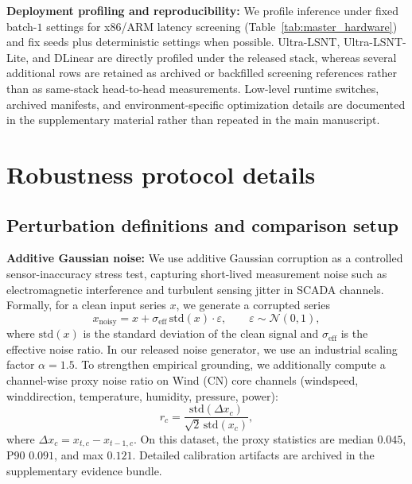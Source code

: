 ﻿\documentclass[review,1p,times]{elsarticle}
\begin{document}
\noindent\textbf{Deployment profiling and reproducibility:} We profile inference under fixed batch-$1$ settings for x86/ARM latency screening (Table~\ref{tab:master_hardware}) and fix seeds plus deterministic settings when possible. Ultra-LSNT, Ultra-LSNT-Lite, and DLinear are directly profiled under the released stack, whereas several additional rows are retained as archived or backfilled screening references rather than as same-stack head-to-head measurements. Low-level runtime switches, archived manifests, and environment-specific optimization details are documented in the supplementary material rather than repeated in the main manuscript.

\section{Robustness protocol details}\label{app:robust_details}
\subsection{Perturbation definitions and comparison setup}
\noindent\textbf{Additive Gaussian noise:}
We use additive Gaussian corruption as a controlled sensor-inaccuracy stress test, capturing short-lived measurement noise such as electromagnetic interference and turbulent sensing jitter in SCADA channels.
Formally, for a clean input series $x$, we generate a corrupted series
\begin{equation}
x_{\text{noisy}} = x + \sigma_{\mathrm{eff}}\,\mathrm{std}(x)\cdot \varepsilon, \qquad \varepsilon \sim \mathcal{N}(0,1),
\end{equation}
where $\mathrm{std}(x)$ is the standard deviation of the clean signal and $\sigma_{\mathrm{eff}}$ is the effective noise ratio.
In our released noise generator, we use an industrial scaling factor $\alpha=1.5$. To strengthen empirical grounding, we additionally compute a channel-wise proxy noise ratio on Wind (CN) core channels (windspeed, winddirection, temperature, humidity, pressure, power):
\begin{equation}
r_c=\frac{\mathrm{std}(\Delta x_c)}{\sqrt{2}\,\mathrm{std}(x_c)},
\end{equation}
where $\Delta x_c=x_{t,c}-x_{t-1,c}$. On this dataset, the proxy statistics are median $0.045$, P90 $0.091$, and max $0.121$. Detailed calibration artifacts are archived in the supplementary evidence bundle.
\end{document}
